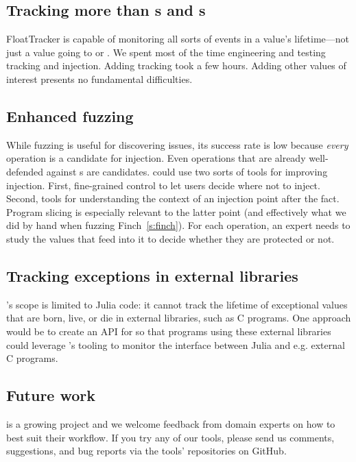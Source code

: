\documentclass{juliacon}
\begin{document}
\subsection{Tracking more than \NaN{}s and \Inf{}s}

FloatTracker is capable of monitoring all sorts of events in a \fp{} value's lifetime---not just a value going to \NaN{} or \Inf{}.
We spent most of the time engineering and testing \NaN{} tracking and injection.
Adding \Inf{} tracking took a few hours.
Adding other values of interest presents no fundamental difficulties.

\subsection{Enhanced fuzzing}

While fuzzing is useful for discovering issues, its success rate
is low because \emph{every} \fp{} operation is a candidate
for injection.
Even operations that are already well-defended against \NaN{}s are candidates.
\FT{} could use two sorts of tools for improving injection.
First, fine-grained control to let users decide where not to inject.
Second, tools for understanding the context of an injection point
after the fact.
Program slicing is especially relevant to the latter point (and effectively
what we did by hand when fuzzing Finch~\cref{s:finch}).
For each operation, an expert needs to study the values that feed into it to
decide whether they are protected or not.


\subsection{Tracking exceptions in external libraries}

\FT{}'s scope is limited to Julia code: it cannot track the lifetime of exceptional values that are born, live, or die in external libraries, such as C programs.
One approach would be to create an API for \FT{} so that programs using these external libraries could leverage \FT{}'s tooling to monitor the interface between Julia and e.g. external C programs.

\subsection{Future work}

\FlowFPX{} is a growing project and we welcome feedback from domain experts
on how to best suit their workflow.
If you try any of our tools, please send us comments, suggestions, and bug reports via the tools' repositories on GitHub.
\end{document}
